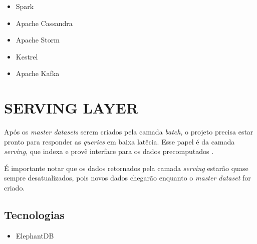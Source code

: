 \begin{itemize}
  \item Spark
  \item Apache Cassandra
  \item Apache Storm
  \item Kestrel
  \item Apache Kafka
\end{itemize}

\section{SERVING LAYER}

Após os \textit{master datasets} serem criados pela camada \textit{batch}, o
projeto precisa estar pronto para responder as \textit{queries} em baixa
latêcia. Esse papel é da camada \textit{serving}, que indexa e provê interface
para os dados precomputados \cite{marz2015}.

É importante notar que os dados retornados pela camada \textit{serving} estarão
quase sempre desatualizados, pois novos dados chegarão enquanto o
\textit{master dataset} for criado.

\subsection{Tecnologias}

\begin{itemize}
    \item ElephantDB
\end{itemize}
